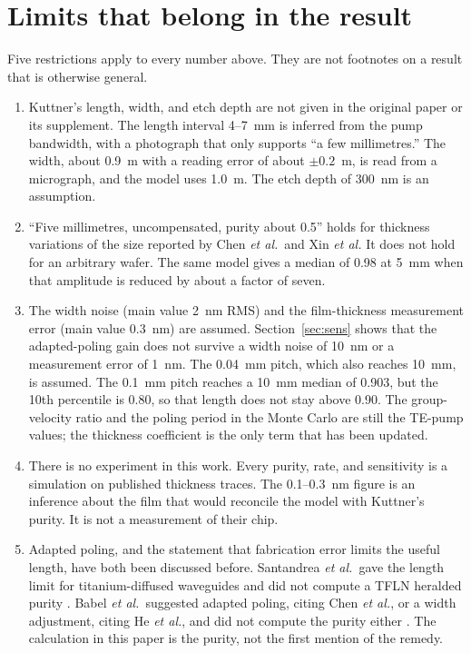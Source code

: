 \documentclass[11pt,a4paper]{article}
\begin{document}
\section{Limits that belong in the result}
\label{sec:limits}
Five restrictions apply to every number above.
They are not footnotes on a result that is otherwise general.

\begin{enumerate}
\item Kuttner's length, width, and etch depth are not given in the original paper or its supplement.
The length interval 4--7~mm is inferred from the pump bandwidth, with a photograph that only supports ``a few millimetres.''
The width, about 0.9~\textmu m with a reading error of about $\pm 0.2$~\textmu m, is read from a micrograph, and the model uses 1.0~\textmu m.
The etch depth of 300~nm is an assumption.
\item ``Five millimetres, uncompensated, purity about 0.5'' holds for thickness variations of the size reported by Chen \emph{et al.}\ and Xin \emph{et al.}
It does not hold for an arbitrary wafer.
The same model gives a median of 0.98 at 5~mm when that amplitude is reduced by about a factor of seven.
\item The width noise (main value 2~nm RMS) and the film-thickness measurement error (main value 0.3~nm) are assumed.
Section~\ref{sec:sens} shows that the adapted-poling gain does not survive a width noise of 10~nm or a measurement error of 1~nm.
The 0.04~mm pitch, which also reaches 10~mm, is assumed.
The 0.1~mm pitch reaches a 10~mm median of 0.903, but the 10th percentile is 0.80, so that length does not stay above 0.90.
The group-velocity ratio and the poling period in the Monte Carlo are still the TE-pump values; the thickness coefficient is the only term that has been updated.
\item There is no experiment in this work.
Every purity, rate, and sensitivity is a simulation on published thickness traces.
The 0.1--0.3~nm figure is an inference about the film that would reconcile the model with Kuttner's purity.
It is not a measurement of their chip.
\item Adapted poling, and the statement that fabrication error limits the useful length, have both been discussed before.
Santandrea \emph{et al.}\ gave the length limit for titanium-diffused waveguides and did not compute a TFLN heralded purity \cite{Santandrea2019}.
Babel \emph{et al.}\ suggested adapted poling, citing Chen \emph{et al.}, or a width adjustment, citing He \emph{et al.}, and did not compute the purity either \cite{Babel2025,He2024}.
The calculation in this paper is the purity, not the first mention of the remedy.
\end{enumerate}
\end{document}
